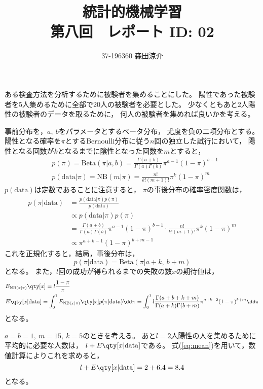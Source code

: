 \documentclass[dvipdfmx, fleqn]{jsarticle}
\title{
	統計的機械学習 \\
    第八回　レポート ID: 02
    }
\author{37-196360 \quad 森田涼介}
\begin{document}
\maketitle

ある検査方法を分析するために被験者を集めることにした。
陽性であった被験者を5人集めるために全部で20人の被験者を必要とした。
少なくともあと2人陽性の被験者のデータを取るために，
何人の被験者を集めれば良いかを考える。

事前分布を，\(a,\ b\)をパラメータとするベータ分布，
尤度を負の二項分布とする。
陽性となる確率を\(\pi\)とするBernoulli分布に従う\(n\)回の独立した試行において，
陽性となる回数が\(k\)となるまでに陰性となった回数を\(m\)とすると，
\begin{align}
    & p(\pi) = \mathrm{Beta}(\pi|a, b)
        = \frac{\Gamma(a+b)}{\Gamma(a) \Gamma(b)} \pi^{a-1} (1-\pi)^{b-1} \\
    & p(\mathrm{data}|\pi)
        = \mathrm{NB}(m|\pi)
        = \frac{n!}{k! (m+1)!} \pi^k (1-\pi)^m
\end{align}
\(p(\mathrm{data})\)は定数であることに注意すると，
\(\pi\)の事後分布の確率密度関数は，
\begin{align}
    p(\pi | \mathrm{data})
        & = \frac{p(\mathrm{data} | \pi) p(\pi)}{p(\mathrm{data})} \\
        & \propto p(\mathrm{data} | \pi) p(\pi) \\
        & = \frac{\Gamma(a+b)}{\Gamma(a) \Gamma(b)} \pi^{a-1} (1-\pi)^{b-1} \cdot \frac{n!}{k! (m+1)!} \pi^k (1-\pi)^m \\
        & \propto \pi^{a + k - 1} (1-\pi)^{b + m - 1}
\end{align}
これを正規化すると，結局，事後分布は，
\begin{equation}
    p(\pi | \mathrm{data}) = \mathrm{Beta}(\pi | a + k,\ b + m)
\end{equation}
となる。
また，\(l\)回の成功が得られるまでの失敗の数\(x\)の期待値は，
\begin{align}
    & E_{\mathrm{NB}(x|\pi)} \qty[x] = l \frac{1 - \pi}{\pi}
    \label{eq:bound} \\
    & E \qty[x|\mathrm{data}]
        = \int_0^1 E_{\mathrm{NB}(x|\pi)} \qty[x] p(\pi | \mathrm{data}) \dd\pi
        = \int_0^1 l \frac{\Gamma(a+b+k+m)}{\Gamma(a+k) \Gamma(b+m)} \pi^{a+k-2} (1-\pi)^{b+m} \dd\pi
    \label{eq:mean}
\end{align}
となる。

\(a = b = 1,\ m = 15,\ k = 5\)のときを考える。
あと\(l = 2\)人陽性の人を集めるために平均的に必要な人数は，
\(l + E \qty[x|\mathrm{data}]\)である。
式(\ref{eq:mean})を用いて，数値計算によりこれを求めると，
\begin{equation}
    l + E \qty[x|\mathrm{data}] = 2 + 6.4 = 8.4
\end{equation}
となる。
\end{document}
